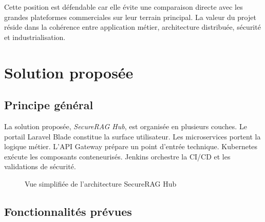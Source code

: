 Cette position est défendable car elle évite une comparaison directe avec les grandes plateformes commerciales sur leur terrain principal. La valeur du projet réside dans la cohérence entre application métier, architecture distribuée, sécurité et industrialisation.

\section{Solution proposée}

\subsection{Principe général}

La solution proposée, \textit{SecureRAG Hub}, est organisée en plusieurs couches. Le portail Laravel Blade constitue la surface utilisateur. Les microservices portent la logique métier. L'API Gateway prépare un point d'entrée technique. Kubernetes exécute les composants conteneurisés. Jenkins orchestre la CI/CD et les validations de sécurité.

\begin{figure}[htbp]
    \centering
    \caption{Vue simplifiée de l'architecture SecureRAG Hub}
    \label{fig:vue_simplifiee_securerag}
\end{figure}

\subsection{Fonctionnalités prévues}

